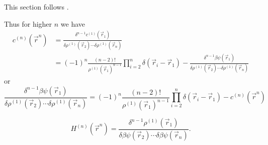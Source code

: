 This section follows \cite{BarratMP1988}.

Thus for higher $n$ we have
\begin{equation}
  \begin{split}
    c^{(n)}(\vec{r}^n)
    &=
    \frac{
      \delta^{n-1} c^{(1)}(\vec{r}_1)
    }{
      \delta \rho^{(1)}(\vec{r}_2) \cdots \delta \rho^{(1)}(\vec{r}_n)
    }
    \\ &=
    (-1)^n
    \frac{(n-2)!}{\rho^{(1)}(\vec{r}_1)^{n-1}}
    \prod_{i=2}^n \delta(\vec{r}_i - \vec{r}_1)
    - \frac{
      \delta^{n-1} \beta\psi(\vec{r}_1)
    }{
      \delta \rho^{(1)}(\vec{r}_2) \cdots \delta \rho^{(1)}(\vec{r}_n)
    }
  \end{split}
\end{equation}
or
\begin{equation}
  \frac{\delta^{n-1} \beta\psi(\vec{r}_1)}{\delta \rho^{(1)}(\vec{r}_2) \cdots \delta \rho^{(1)}(\vec{r}_n)}
  =
  (-1)^n
  \frac{(n-2)!}{\rho^{(1)}(\vec{r}_1)^{n-1}}
  \prod_{i=2}^n \delta(\vec{r}_i - \vec{r}_1)
  - c^{(n)}(\vec{r}^n)
\end{equation}

\begin{equation*}
  H^{(n)}(\vec{r}^n)
  =
  \frac{
    \delta^{n-1} \rho^{(1)}(\vec{r}_1)
  }{
    \delta \beta\psi(\vec{r}_2) \cdots \delta \beta\psi(\vec{r}_n)
  }.
\end{equation*}

